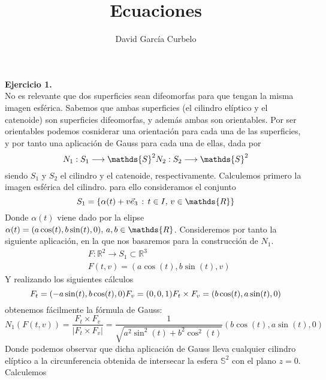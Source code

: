 \documentclass[fleqn]{article}
\author{David García Curbelo}
\title{Ecuaciones}
\def\R{\mathds{R}}
\begin{document}
    \maketitle
    \setcounter{page}{1}
    \pagestyle{plain}

    \textbf{Ejercicio 1. } \\

    No es relevante que dos superficies sean difeomorfas para que tengan la misma imagen esférica. Sabemos que ambas superficies (el cilindro elíptico y el catenoide) 
    son superficies difeomorfas, y además ambas son orientables. Por ser orientables podemos cosniderar una orientación para cada una de las superficies, y por tanto una aplicación 
    de Gauss para cada una de ellas, dada por 
    \begin{equation*}
        N_1: S_1 \longrightarrow \mathds{S}^2\\
        N_2: S_2 \longrightarrow \mathds{S}^2
    \end{equation*}
    siendo $S_1$ y $S_2$ el cilindro y el catenoide, respectivamente. Calculemos primero la imagen esférica del cilindro. para ello consideramos el conjunto
    $$S_1 = \{\alpha(t) + v\vec{e}_3 \thinspace : \thinspace t\in I, \thinspace v\in \R\}$$
    Donde $\alpha(t)$ viene dado por la elipse $\alpha(t) = (a\cos(t), b\sin(t), 0), \thinspace a,b\in \R$. Consideremos por tanto la siguiente aplicación, en la que nos basaremos para 
    la construcción de $N_1$.
    \begin{equation*}
        \begin{aligned}
            & F:\R^2 \rightarrow S_1 \subset \R^3 \\
            &F(t,v) = (a\cos(t), b\sin(t), v)
        \end{aligned}
    \end{equation*}
    Y realizando los siguientes cálculos
    \begin{equation*}
        F_t = (-a\sin(t), b\cos(t), 0) \\
        F_v = (0,0,1) \\
        F_t \times F_v = (b\cos(t), a\sin(t), 0)
    \end{equation*}
    obtenemos fácilmente la fórmula de Gauss:
    $$N_1(F(t,v)) = \frac{F_t \times F_v}{\left|F_t \times F_v\right|} = \frac{1}{\sqrt{a^2\sin^2(t) + b^2\cos^2(t)}} (b\cos(t), a\sin(t), 0)$$
    Donde podemos observar que dicha aplicación de Gauss lleva cualquier cilindro elíptico a la circunferencia obtenida de intersecar la esfera $\mathds{S}^2$ con el plano $z=0$. Calculemos
\end{document}

